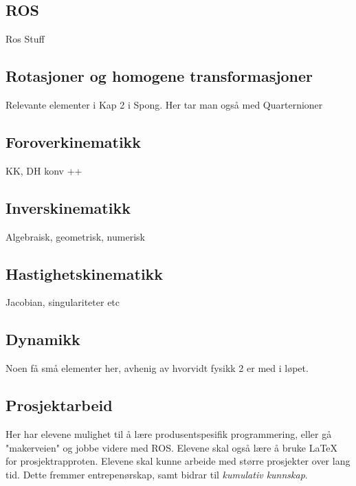 \subsection*{ROS}
    Ros Stuff


\subsection*{Rotasjoner og homogene transformasjoner}
    Relevante elementer i Kap 2 i Spong. Her tar man også med Quarternioner


\subsection*{Foroverkinematikk}
    KK, DH konv ++


\subsection*{Inverskinematikk}
    Algebraisk, geometrisk, numerisk


\subsection*{Hastighetskinematikk}
    Jacobian, singulariteter etc


\subsection*{Dynamikk}
    Noen få små elementer her, avhenig av hvorvidt fysikk 2 er med i løpet.


\subsection*{Prosjektarbeid}
    Her har elevene mulighet til å lære produsentspesifik programmering, eller gå "makerveien" og jobbe videre med ROS. Elevene skal også lære å bruke LaTeX for prosjektrapproten. Elevene skal kunne arbeide med større prosjekter over lang tid. Dette fremmer entrepenørskap, samt bidrar til \emph{kumulativ kunnskap}.
